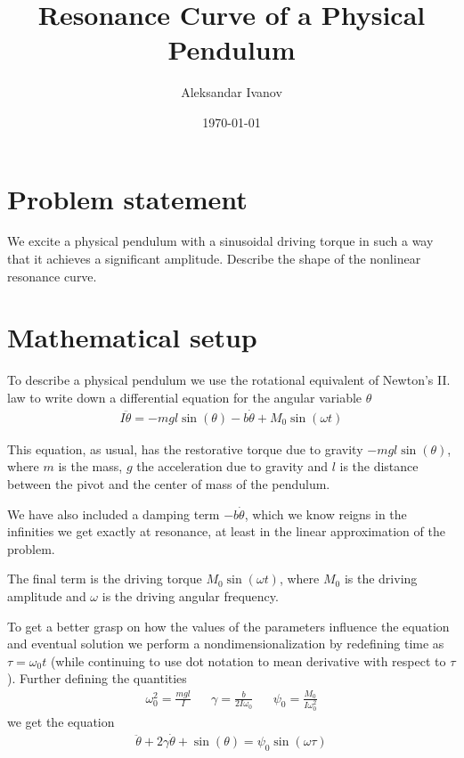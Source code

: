 \documentclass[12pt,a4paper]{article}
\begin{document}
\title{Resonance Curve of a Physical Pendulum}
\author{Aleksandar Ivanov}
\date{\today}
\maketitle

\section{Problem statement}

We excite a physical pendulum with a sinusoidal driving torque in such a way that it achieves a significant amplitude. Describe the shape of the nonlinear resonance curve.

\section{Mathematical setup}

To describe a physical pendulum we use the rotational equivalent of Newton's II. law to write down a differential equation for the angular variable $\theta$
%
\begin{align}
I \ddot{\theta} = -mgl \sin(\theta) - b \dot{\theta} + M_0 \sin(\omega t)
\end{align}

This equation, as usual, has the restorative torque due to gravity $-mgl\sin(\theta)$, where $m$ is the mass, $g$ the acceleration due to gravity and $l$ is the distance between the pivot and the center of mass of the pendulum.

We have also included a damping term $-b \dot{\theta}$, which we know reigns in the infinities we get exactly at resonance, at least in the linear approximation of the problem.

The final term is the driving torque $M_0 \sin(\omega t)$, where $M_0$ is the driving amplitude and $\omega$ is the driving angular frequency.

To get a better grasp on how the values of the parameters influence the equation and eventual solution we perform a nondimensionalization by redefining time as $\tau = \omega_0 t$ (while continuing to use dot notation to mean derivative with respect to $\tau$). Further defining the quantities
%
\begin{align}
&\omega_0^2 = \frac{mgl}{I}& &\gamma = \frac{b}{2I \omega_0}& &\psi_0 = \frac{M_0}{I \omega_0^2}&
\end{align}\label{diffeq}
%
we get the equation
%
\begin{align}
\ddot{\theta} + 2\gamma \dot{\theta} + \sin(\theta) = \psi_0 \sin(\omega \tau)
\end{align}
\end{document}
